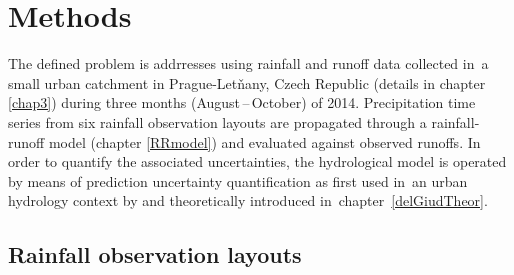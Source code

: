\documentclass{ctuthesis}\usepackage[]{graphicx}\usepackage[]{color}
\begin{document}
 
\section{Methods} \label{pilotMnM}

The defined problem is addrresses using rainfall and runoff data collected in~a small urban catchment in Prague-Letňany, Czech Republic (details in chapter \ref{chap3}) during three months (August\,--\,October) of 2014. Precipitation time series from six rainfall observation layouts are propagated through a rainfall-runoff model (chapter \ref{RRmodel}) and evaluated against observed runoffs. In order to quantify the associated uncertainties, the hydrological model is operated by means of prediction uncertainty quantification as first used in~an urban hydrology context by \cite{giudice2013improving} and theoretically introduced in~chapter~\ref{delGiudTheor}.


\subsection{Rainfall observation layouts} 
\end{document}

